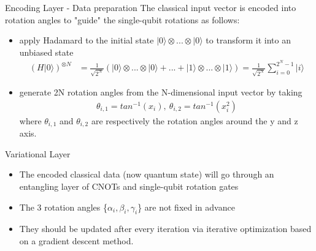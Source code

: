 \begin{frame}{Encoding Layer - Data preparation}
	The \alert{classical} input vector is encoded into rotation angles to "guide" the single-qubit rotations as follows:
	\begin{itemize}
	\item<2-> 
		apply Hadamard to the initial state $|0\rangle \otimes ... \otimes |0 \rangle$ to transform it into an \alert{unbiased} state
		\begin{align*}
			(H | 0 \rangle)^{\otimes N} &= \frac{1}{\sqrt{2^N}} (|0\rangle \otimes ... \otimes |0\rangle + ... + |1\rangle \otimes ... \otimes |1\rangle) 
				=  \frac{1}{\sqrt{2^N}} \sum^{2^N - 1}_{i = 0} |i\rangle
		\end{align*}
	  \item<3->
		generate 2N \alert{rotation} angles from the N-dimensional input vector by taking
		\begin{align*}
			\theta_{i,1} = tan^{-1}(x_i), \ \theta_{i,2} = tan^{-1} (x^2_i)
		\end{align*}
		where $\theta_{i,1}$ and $\theta_{i,2}$ are respectively the rotation angles around the y and z axis.
	\end{itemize}
\end{frame}

\begin{frame}{Variational Layer}
	\begin{itemize}
		\item The encoded classical data (now \alert{quantum state}) will go through an entangling layer of CNOTs and single-qubit rotation gates
		\item The 3 rotation angles \{$\alpha_i, \beta_i, \gamma_i$\} are not fixed in advance
		\item They should be updated after every iteration via iterative optimization based on a \alert{gradient descent method}.
	\end{itemize}
\end{frame}

